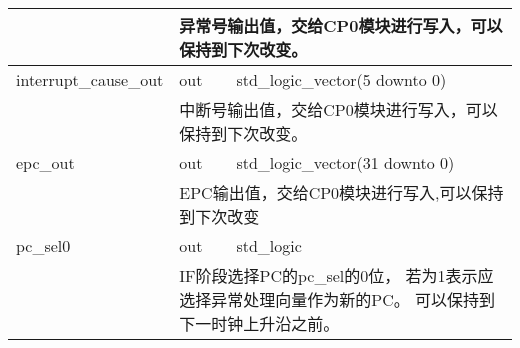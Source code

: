 \begin{tabularx}{\textwidth}{lll}
            \cmidrule(l){2-3}
            &
            \multicolumn{2}{X}{
                异常号输出值，交给CP0模块进行写入，可以保持到下次改变。
            } \\
            \midrule
	        interrupt\_cause\_out & out & std\_logic\_vector(5 downto 0) \\
            \cmidrule(l){2-3}
            &
            \multicolumn{2}{X}{
                中断号输出值，交给CP0模块进行写入，可以保持到下次改变。
            } \\
            \midrule
	        epc\_out        & out       & std\_logic\_vector(31 downto 0) \\
            \cmidrule(l){2-3}
            &
            \multicolumn{2}{X}{
                EPC输出值，交给CP0模块进行写入,可以保持到下次改变
            } \\
            \midrule
	        pc\_sel0        & out       & std\_logic \\
            \cmidrule(l){2-3}
            &
            \multicolumn{2}{X}{
                IF阶段选择PC的pc\_sel的0位，%
                若为1表示应选择异常处理向量作为新的PC。%
                可以保持到下一时钟上升沿之前。
            } \\

            \bottomrule
        \end{tabularx}


